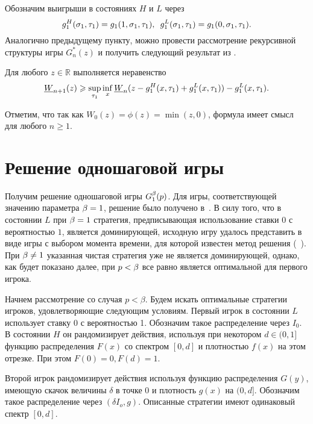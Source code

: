 {Обозначим выигрыши в состояниях $H$ и $L$ через
\begin{equation*}
 g^H_1(\sigma_1, \tau_1) = g_1(1, \sigma_1, \tau_1), \enskip g^L_1(\sigma_1, \tau_1) = g_1(0, \sigma_1, \tau_1).
\end{equation*}
Аналогично предыдущему пункту, можно провести рассмотрение рекурсивной структуры игры $G^*_n(z)$ и получить следующий результат из \cite{demeyer02}.
\begin{lemma}\label{ch3:lem:low-bound-dual:general}
  Для любого $z \in \mathbb{R}$ выполняется неравенство
  \begin{equation}\label{ch3:eq:low-bound-dual:general}
    \LW{n+1}(z) \geqslant \sup_{\tau_1} \inf_x
    \LW{n}(z - g^H_1(x, \tau_1) + g_1^L(x, \tau_1)) - g^L_1(x, \tau_1).
  \end{equation}
\end{lemma}
Отметим, что так как $W_0(z) = \phi(z) = \min(z, 0)$, формула имеет смысл для любого $n \geqslant 1$.

\section{Решение одношаговой игры}
\label{ch3:sec:1st}

Получим решение одношаговой игры $G^{\beta}_1(p)$.
Для игры, соответствующей значению параметра $\beta = 1$, решение было получено в~\cite{sandomirskaya12}.
В силу того, что в состоянии $L$ при $\beta = 1$ стратегия, предписывающая использование ставки $0$ с вероятностью $1$, является доминирующей, исходную игру удалось представить в виде игры с выбором момента времени, для которой известен метод решения (\seename~\cite{karlin64}).
При $\beta \neq 1$ указанная чистая стратегия уже не является доминирующей, однако, как будет показано далее, при $p < \beta$ все равно является оптимальной для первого игрока.

Начнем рассмотрение со случая $p < \beta$.
Будем искать оптимальные стратегии игроков, удовлетворяющие следующим условиям.
Первый игрок в состоянии $L$ использует ставку $0$ с вероятностью 1.
Обозначим такое распределение через $I_0$.
В состоянии $H$ он рандомизирует действия, используя при некотором $d \in (0, 1]$ функцию распределения $F(x)$ со спектром $[0, d]$ и плотностью $f(x)$ на этом отрезке. При этом $F(0) = 0, F(d) = 1$.

Второй игрок рандомизирует действия используя функцию распределения $G(y)$, имеющую скачок величины $\delta$ в точке $0$ и плотность $g(x)$ на $(0, d]$.
Обозначим такое распределение через $(\delta I_o, g)$.
Описанные стратегии имеют одинаковый спектр $[0, d]$.

}
